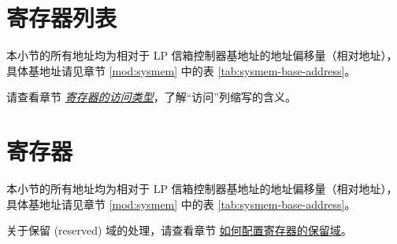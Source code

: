 \documentclass[main\_\_CN.tex]{subfiles}
\begin{document}

\hypertarget{lpmailbox-reg-summ}{}
\section{寄存器列表}
\label{sec:lpmailbox-reg-summ}

本小节的所有地址均为相对于 LP 信箱控制器基地址的地址偏移量（相对地址），具体基地址请见章节 \ref{mod:sysmem} \textit{} 中的表 \ref{tab:sysmem-base-address}。

请查看章节 \hyperref[glossary-access-types]{\textit{寄存器的访问类型}}，了解“访问”列缩写的含义。





\newpage
\section{寄存器}

本小节的所有地址均为相对于 LP 信箱控制器基地址的地址偏移量（相对地址），具体基地址请见章节 \ref{mod:sysmem} \textit{} 中的表 \ref{tab:sysmem-base-address}。

关于保留 (reserved) 域的处理，请查看章节 \hyperref[programming-reserved-field]{如何配置寄存器的保留域}。


\end{document}
